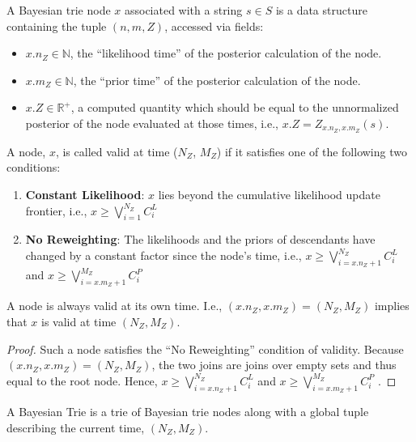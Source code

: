\begin{definition}
    A Bayesian trie node $x$ associated with a string $s \in S$ is a data structure containing the tuple $(n, m, Z)$, accessed via fields:
    \begin{itemize}
        \item $x.n_Z \in \mathbb{N}$, the ``likelihood time'' of the posterior calculation of the node.
        \item $x.m_Z \in \mathbb{N}$, the ``prior time'' of the posterior calculation of the node.
        \item $x.Z \in \mathbb{R}^+$, a computed quantity which should be equal to the unnormalized posterior of the node evaluated at those times, i.e., $x.Z = Z_{x.n_Z, x.m_Z}(s)$.
    \end{itemize}
\end{definition}

\begin{definition}
    A node, $x$, is called valid at time ($N_Z$, $M_Z$)
    if it satisfies one of the following two conditions:
    \begin{enumerate}
        \item \textbf{Constant Likelihood}: $x$ lies beyond
        the cumulative likelihood update frontier, i.e.,
        $x \geq \bigvee_{i=1}^{N_Z} C^L_i$
        \item \textbf{No Reweighting}:
        The likelihoods and the priors of descendants have changed by a constant factor
        since the node's time, i.e.,
        $x \geq \bigvee_{i=x.n_Z+1}^{N_Z} C^L_i$ and $x \geq \bigvee_{i=x.m_Z+1}^{M_Z} C^P_i$
    \end{enumerate}
\end{definition}

\begin{lemma}
\label{lemma:current-nodes-are-valid}
    A node is always valid at its own time.
    I.e.,
    $(x.n_Z, x.m_Z) = (N_Z, M_Z)$ implies that $x$ is valid at time $(N_Z, M_Z)$.
\end{lemma}
\begin{proof}
    Such a node satisfies the ``No Reweighting'' condition
    of validity. Because $(x.n_Z, x.m_Z) = (N_Z, M_Z)$, the two 
    joins are joins over empty sets and thus equal to the root node.
    Hence,
        $x \geq \bigvee_{i=x.n_Z+1}^{N_Z} C^L_i$ and $x \geq \bigvee_{i=x.m_Z+1}^{M_Z} C^P_i$
    .
\end{proof}

\begin{definition}
    A Bayesian Trie is a trie of Bayesian trie nodes
    along with a global tuple describing the current time,
    $(N_Z, M_Z)$.
\end{definition}

